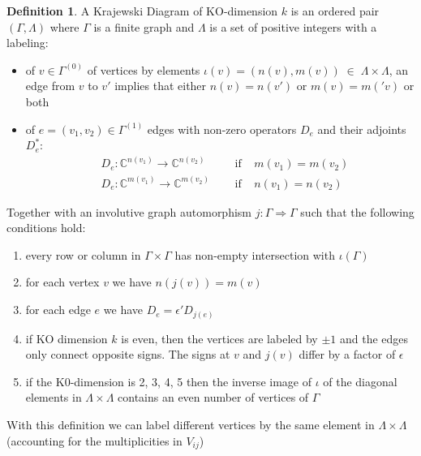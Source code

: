 \documentclass[a4paper]{article}
\theoremstyle{definition}
\newtheorem{definition}{Definition}
\theoremstyle{definition}
\theoremstyle{definition}
\theoremstyle{theorem}
\theoremstyle{theorem}
\theoremstyle{theorem}
\begin{document}
\begin{definition}
    A Krajewski Diagram of KO-dimension $k$ is an ordered pair $(\Gamma,
    \Lambda)$ where $\Gamma$ is a finite graph and $\Lambda$ is a set of
    positive integers with a labeling:

    \begin{itemize}
        \item of $v \in \Gamma^{(0)}$ of vertices by elements $\iota (v) =
            (n(v), m(v))\; \in \; \Lambda \times \Lambda$, an edge from $v$ to
            $v'$ implies that either $n(v) = n(v')$ or $m(v) = m('v)$ or both
        \item of $e = (v_1, v_2) \in \Gamma^{(1)}$ edges with non-zero
            operators $D_e$ and their adjoints $D_e^*$:
            \begin{align}
                &D_e:\mathbb{C}^{n(v_1)} \rightarrow
                \mathbb{C}^{n(v_2)}\;\;\;\;\; &\text{if} \;\;\;\; m(v_1) = m(v_2)\\
                &D_e:\mathbb{C}^{m(v_1)} \rightarrow
                \mathbb{C}^{m(v_2)}\;\;\;\;\; &\text{if} \;\;\;\; n(v_1) = n(v_2)
            \end{align}
    \end{itemize}
    Together with an involutive graph automorphism $j:\Gamma \Rightarrow
    \Gamma$ such that the following conditions hold:
    \begin{enumerate}
        \item every row or column in $\Gamma \times \Gamma$ has non-empty
            intersection with $\iota(\Gamma)$
        \item for each vertex $v$ we have $n(j(v)) = m(v)$
        \item for each edge $e$ we have $D_e = \epsilon' D_{j(e)}$
        \item if KO dimension $k$ is even, then the vertices are labeled by
            $\pm 1$ and the edges only connect opposite signs. The signs at $v$
            and $j(v)$ differ by a factor of $\epsilon$
        \item if the K0-dimension is 2, 3, 4, 5 then the inverse image of
            $\iota$ of the diagonal elements in $\Lambda \times \Lambda$
            contains an even number of vertices of $\Gamma$
    \end{enumerate}
\end{definition}
With this definition we can label different vertices by the same element in
$\Lambda \times \Lambda$ (accounting for the multiplicities in $V_{ij}$)
\newline
\end{document}
